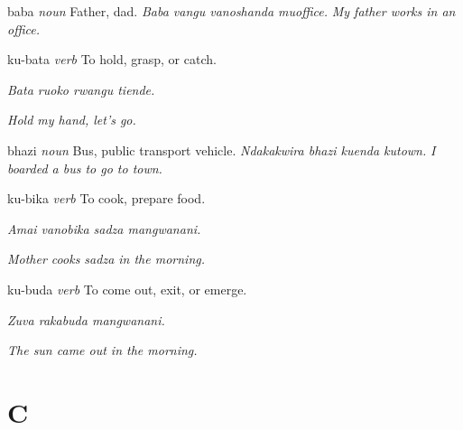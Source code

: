 \documentclass[10pt,twoside]{book}
\newcommand{\partofpeech}[1]{%
    \textit{\color{partofpeechcolor}#1}%
}
\newcommand{\example}[2]{%
    \textit{\color{examplecolor}#1} \textit{#2}%
}
\begin{document}
\begin{multicols}{2}
\raggedright
{}

\begin{dictentry}{baba}
\partofpeech{noun} Father, dad. \example{Baba vangu vanoshanda muoffice.}{My father works in an office.}
\end{dictentry}

\begin{dictentry}{ku-bata}
\partofpeech{verb} To hold, grasp, or catch.

\textit{Bata ruoko rwangu tiende.}

\textit{Hold my hand, let's go.}
\end{dictentry}

\begin{dictentry}{bhazi}
\partofpeech{noun} Bus, public transport vehicle. \example{Ndakakwira bhazi kuenda kutown.}{I boarded a bus to go to town.}
\end{dictentry}

\begin{dictentry}{ku-bika}
\partofpeech{verb} To cook, prepare food.

\textit{Amai vanobika sadza mangwanani.}

\textit{Mother cooks sadza in the morning.}
\end{dictentry}

\begin{dictentry}{ku-buda}
\partofpeech{verb} To come out, exit, or emerge.

\textit{Zuva rakabuda mangwanani.}

\textit{The sun came out in the morning.}
\end{dictentry}

\end{multicols}

\chapter*{C}
\label{chap:C}
\end{document}
